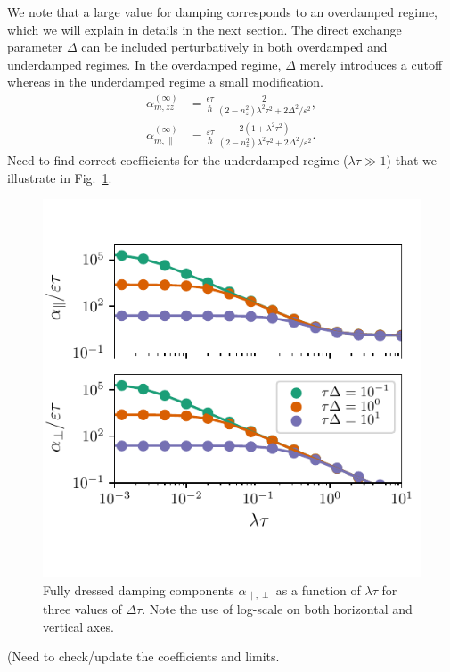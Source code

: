 We note that a large value for damping corresponds to an overdamped regime, which we will explain in details in the next section. The direct exchange parameter $\Delta$ can be included perturbatively in both overdamped and underdamped regimes. In the overdamped regime,  $\Delta$ merely introduces a cutoff whereas in the underdamped regime a small modification.
\begin{align}
\label{eq:alphaparallelzerodelta}
    \alpha_{m,zz}^{(\infty)}  & = \frac{\epsilon \tau}{\hbar}\, \frac{2}{(2-n_z^2)\lambda^2\tau^2+2\Delta^2/\varepsilon^2},\\
    \alpha_{m,\parallel}^{(\infty)}  & = \frac{\varepsilon\tau}{\hbar}\,\frac{2(1+\lambda^2\tau^2)}{(2-n_z^2)\lambda^2\tau^2+2\Delta^2/\varepsilon^2}.
\end{align}
{\color{blue} Need to find correct coefficients for the underdamped regime ($\lambda\tau\gg1$)}
that we illustrate in Fig.~\ref{fig:alpha3}.
\begin{figure}
    \centering
    \includegraphics{gfx/Chapter04/alpha_plot1.pdf}
    \caption{Fully dressed damping components $\alpha_{\parallel,\perp}$ as a function of $\lambda\tau$ for three values of $\Delta\tau$. Note the use of log-scale on both horizontal and vertical axes.}
    \label{fig:alpha3}
\end{figure}
{\color{blue} (Need to check/update the coefficients and limits. }
%
%
